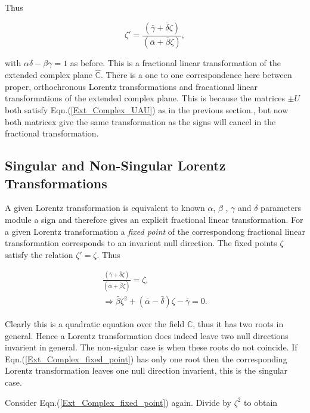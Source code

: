 \noindent Thus 

\begin{equation}\label{Extended_Complex_Fractional_Linear_Transformation}
\zeta' = \frac{(\bar{\gamma} + \bar{\delta}\zeta)}{(\bar{\alpha} + \bar{\beta}\zeta)},
\end{equation}

\noindent with $\alpha\delta - \beta\gamma = 1$ as before. This is a fractional linear transformation of the extended complex plane $\hat{\mathbb{C}}$. There is a one to one correspondence here between proper, orthochronous Lorentz transformations and fracational linear transformations of the extended complex plane. This is because the matrices $\pm U$ both satisfy Eqn.(\ref{Ext_Complex_UAU}) as in the previous section., but now both matricex give the same transformation as the signs will cancel in the fractional transformation.

\subsection{Singular and Non-Singular Lorentz Transformations}

A given Lorentz transformation is equivalent to known $\alpha$, $\beta$ , $\gamma$ and $\delta$ parameters module a sign and therefore gives an explicit fractional linear transformation. For a given Lorentz transformation a \textit{fixed point} of the correspondong fractional linear transformation corresponds to an invarient null direction. The fixed points $\zeta$ satisfy the relation $\zeta' = \zeta$. Thus

\begin{eqnarray}\nonumber
\frac{(\bar{\gamma} + \bar{\delta}\zeta)}{(\bar{\alpha} + \bar{\beta}\zeta)} = \zeta, \\\label{Ext_Complex_fixed_point}
\Rightarrow \bar{\beta}\zeta^2 + (\bar{\alpha}- \bar{\delta})\zeta - \bar{\gamma} = 0. 
\end{eqnarray}

\noindent Clearly this is a quadratic equation over the field $\mathbb{C}$, thus it has two roots in general. Hence a Lorentz transformation does indeed leave two null directions invarient in general. The non-sigular case is when these roots do not coincide. If Eqn.(\ref{Ext_Complex_fixed_point}) has only one root then the corresponding Lorentz transformation leaves one null direction invarient, this is the singular case.

Consider Eqn.(\ref{Ext_Complex_fixed_point}) again. Divide by $\zeta^2$ to obtain


